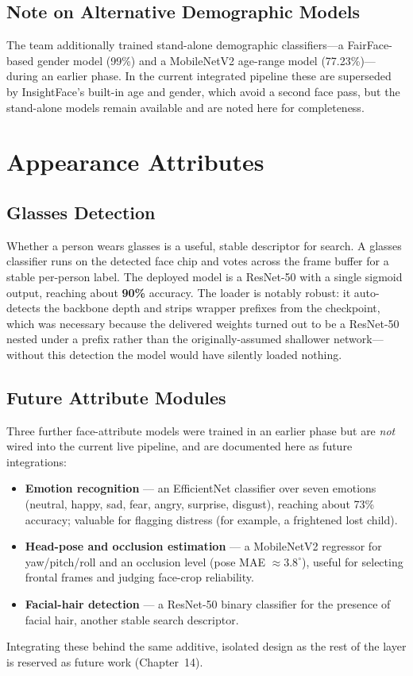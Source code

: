 \documentclass[12pt]{report}
\begin{document}
\subsection{Note on Alternative Demographic Models}
The team additionally trained stand-alone demographic classifiers---a FairFace-based gender model (99\%) and a MobileNetV2 age-range model (77.23\%)---during an earlier phase. In the current integrated pipeline these are superseded by InsightFace's built-in age and gender, which avoid a second face pass, but the stand-alone models remain available and are noted here for completeness.

\section{Appearance Attributes}
\subsection{Glasses Detection}
Whether a person wears glasses is a useful, stable descriptor for search. A glasses classifier runs on the detected face chip and votes across the frame buffer for a stable per-person label. The deployed model is a ResNet-50 with a single sigmoid output, reaching about \textbf{90\%} accuracy. The loader is notably robust: it auto-detects the backbone depth and strips wrapper prefixes from the checkpoint, which was necessary because the delivered weights turned out to be a ResNet-50 nested under a prefix rather than the originally-assumed shallower network---without this detection the model would have silently loaded nothing.

\subsection{Future Attribute Modules}
Three further face-attribute models were trained in an earlier phase but are \emph{not} wired into the current live pipeline, and are documented here as future integrations:
\begin{itemize}
    \item \textbf{Emotion recognition} --- an EfficientNet classifier over seven emotions (neutral, happy, sad, fear, angry, surprise, disgust), reaching about 73\% accuracy; valuable for flagging distress (for example, a frightened lost child).
    \item \textbf{Head-pose and occlusion estimation} --- a MobileNetV2 regressor for yaw/pitch/roll and an occlusion level (pose MAE $\approx 3.8^{\circ}$), useful for selecting frontal frames and judging face-crop reliability.
    \item \textbf{Facial-hair detection} --- a ResNet-50 binary classifier for the presence of facial hair, another stable search descriptor.
\end{itemize}
Integrating these behind the same additive, isolated design as the rest of the layer is reserved as future work (Chapter~14).
\end{document}
